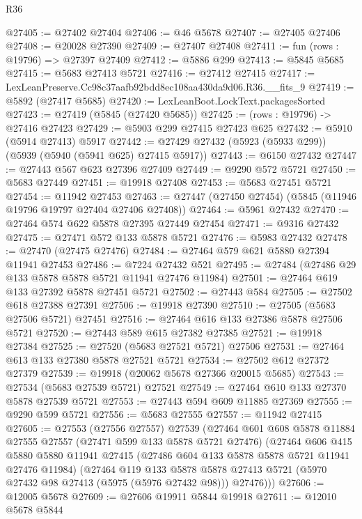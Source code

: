 \begin{lexlean}{R36}
\begin{coremodule}
@27405 := @27402 @27404
@27406 := @46 @5678
@27407 := @27405 @27406
@27408 := @20028 @27390
@27409 := @27407 @27408
@27411 := fun (rows : @19796) => @27397 @27409
@27412 := @5886 @299
@27413 := @5845 @5685
@27415 := @5683 @27413 @5721
@27416 := @27412 @27415
@27417 := LexLeanPreserve.Cc98c37aafb92bdd8ec108aa430da9d06.R36.__fits_9
@27419 := @5892 (@27417 @5685)
@27420 := LexLeanBoot.LockText.packagesSorted
@27423 := @27419 (@5845 (@27420 @5685))
@27425 := (rows : @19796) -> @27416 @27423
@27429 := @5903 @299 @27415 @27423 @625
@27432 := @5910 (@5914 @27413) @5917
@27442 := @27429 @27432 (@5923 (@5933 @299)) (@5939 (@5940 (@5941 @625) @27415 @5917))
@27443 := @6150 @27432
@27447 := @27443 @567 @623 @27396 @27409
@27449 := @9290 @572 @5721
@27450 := @5683 @27449
@27451 := @19918 @27408
@27453 := @5683 @27451 @5721
@27454 := @11942 @27453
@27463 := @27447 (@27450 @27454) (@5845 (@11946 @19796 @19797 @27404 @27406 @27408))
@27464 := @5961 @27432
@27470 := @27464 @574 @622 @5878 @27395 @27449 @27454
@27471 := @9316 @27432
@27475 := @27471 @572 @133 @5878 @5721
@27476 := @5983 @27432
@27478 := @27470 (@27475 @27476)
@27484 := @27464 @579 @621 @5880 @27394 @11941 @27453
@27486 := @7224 @27432 @521
@27495 := @27484 (@27486 @29 @133 @5878 @5878 @5721 @11941 @27476 @11984)
@27501 := @27464 @619 @133 @27392 @5878 @27451 @5721
@27502 := @27443 @584
@27505 := @27502 @618 @27388 @27391
@27506 := @19918 @27390
@27510 := @27505 (@5683 @27506 @5721) @27451
@27516 := @27464 @616 @133 @27386 @5878 @27506 @5721
@27520 := @27443 @589 @615 @27382 @27385
@27521 := @19918 @27384
@27525 := @27520 (@5683 @27521 @5721) @27506
@27531 := @27464 @613 @133 @27380 @5878 @27521 @5721
@27534 := @27502 @612 @27372 @27379
@27539 := @19918 (@20062 @5678 @27366 @20015 @5685)
@27543 := @27534 (@5683 @27539 @5721) @27521
@27549 := @27464 @610 @133 @27370 @5878 @27539 @5721
@27553 := @27443 @594 @609 @11885 @27369
@27555 := @9290 @599 @5721
@27556 := @5683 @27555
@27557 := @11942 @27415
@27605 := @27553
    (@27556 @27557)
    @27539
    (@27464
      @601
      @608
      @5878
      @11884
      @27555
      @27557
      (@27471 @599 @133 @5878 @5721 @27476)
      (@27464
        @606
        @415
        @5880
        @5880
        @11941
        @27415
        (@27486 @604 @133 @5878 @5878 @5721 @11941 @27476 @11984)
        (@27464
          @119
          @133
          @5878
          @5878
          @27413
          @5721
          (@5970 @27432 @98 @27413 (@5975 (@5976 @27432 @98)))
          @27476)))
@27606 := @12005 @5678
@27609 := @27606 @19911 @5844 @19918
@27611 := @12010 @5678 @5844

\end{coremodule}
\end{lexlean}
